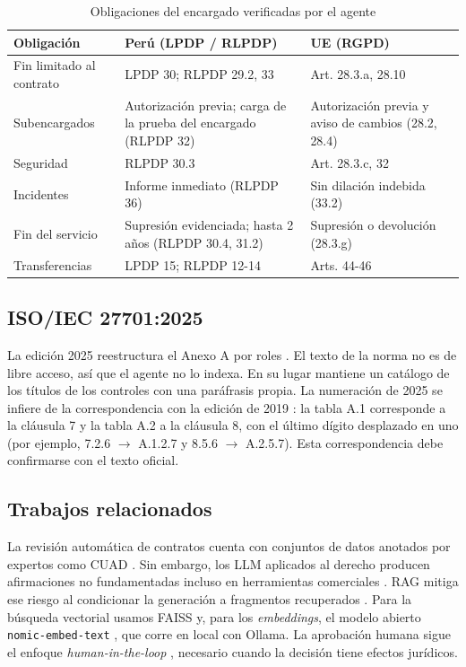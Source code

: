 \documentclass[conference]{IEEEtran}
\begin{document}
\begin{table}[t]
\centering
\caption{Obligaciones del encargado verificadas por el agente}
\label{tab:comparacion}
\footnotesize
\begin{tabular}{@{}p{}p{}p{}@{}}
\toprule
Obligación & Perú (LPDP / RLPDP) & UE (RGPD) \\
\midrule
Fin limitado al contrato & LPDP 30; RLPDP 29.2, 33 & Art. 28.3.a, 28.10 \\
Subencargados & Autorización previa; carga de la prueba del encargado (RLPDP 32) & Autorización previa y aviso de cambios (28.2, 28.4) \\
Seguridad & RLPDP 30.3 & Art. 28.3.c, 32 \\
Incidentes & Informe inmediato (RLPDP 36) & Sin dilación indebida (33.2) \\
Fin del servicio & Supresión evidenciada; hasta 2 años (RLPDP 30.4, 31.2) & Supresión o devolución (28.3.g) \\
Transferencias & LPDP 15; RLPDP 12-14 & Arts. 44-46 \\
\bottomrule
\end{tabular}
\end{table}

\subsection{ISO/IEC 27701:2025}
La edición 2025 reestructura el Anexo A por roles \cite{iso27701_2025}. El texto de la norma no es de libre acceso, así que el agente no lo indexa. En su lugar mantiene un catálogo de los títulos de los controles con una paráfrasis propia. La numeración de 2025 se infiere de la correspondencia con la edición de 2019 \cite{iso27701_2019}: la tabla A.1 corresponde a la cláusula 7 y la tabla A.2 a la cláusula 8, con el último dígito desplazado en uno (por ejemplo, 7.2.6 $\rightarrow$ A.1.2.7 y 8.5.6 $\rightarrow$ A.2.5.7). Esta correspondencia debe confirmarse con el texto oficial.

\subsection{Trabajos relacionados}
La revisión automática de contratos cuenta con conjuntos de datos anotados por expertos como CUAD \cite{hendrycks2021cuad}. Sin embargo, los LLM aplicados al derecho producen afirmaciones no fundamentadas incluso en herramientas comerciales \cite{magesh2024hallucination}. RAG mitiga ese riesgo al condicionar la generación a fragmentos recuperados \cite{lewis2020rag,gao2023survey}. Para la búsqueda vectorial usamos FAISS \cite{johnson2019faiss} y, para los \emph{embeddings}, el modelo abierto \texttt{nomic-embed-text} \cite{nussbaum2024nomic}, que corre en local con Ollama. La aprobación humana sigue el enfoque \emph{human-in-the-loop} \cite{wu2022hitl}, necesario cuando la decisión tiene efectos jurídicos.
\end{document}
